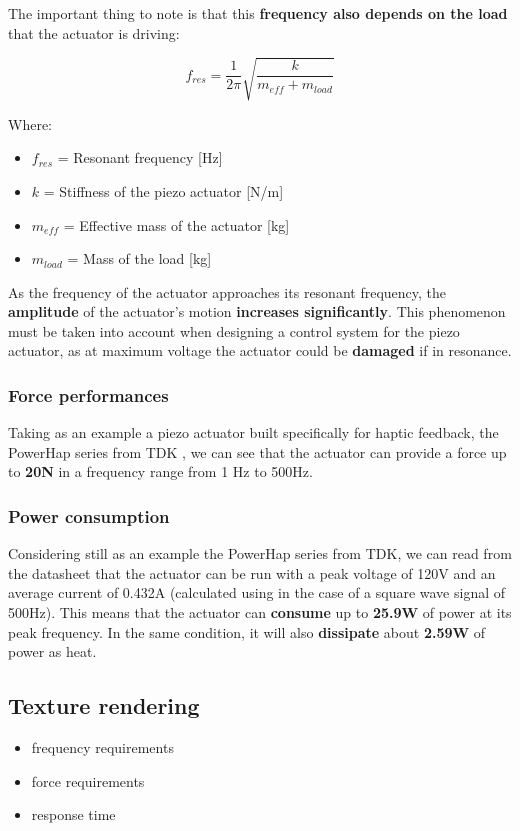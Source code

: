 \begin{samepage}
    The important thing to note is that this \textbf{frequency also depends on the load} that the actuator is driving:
    \nopagebreak

    \begin{equation*}
        f_{res} = \frac{1}{2\pi} \sqrt{\frac{k}{m_{eff}+m_{load}}}
    \end{equation*}
    \nopagebreak

    Where:
    \nopagebreak

    \begin{itemize}
        \item \( f_{res} \) = Resonant frequency [Hz]
        \item \( k \) = Stiffness of the piezo actuator [N/m]
        \item \( m_{eff} \) = Effective mass of the actuator [kg]
        \item \( m_{load} \) = Mass of the load [kg]
    \end{itemize}
\end{samepage}


As the frequency of the actuator approaches its resonant frequency, the \textbf{amplitude} of the actuator's motion \textbf{increases significantly}. This phenomenon must be taken into account when designing a control system for the piezo actuator, as at maximum voltage the actuator could be \textbf{damaged} if in resonance.

\subsubsection{Force performances}
Taking as an example a piezo actuator built specifically for haptic feedback, the PowerHap series from TDK \cite{Piezo_Haptic_Actuator}, we can see that the actuator can provide a force up to \textbf{20N} in a frequency range from 1 Hz to 500Hz.

\subsubsection{Power consumption}
Considering still as an example the PowerHap series from TDK, we can read from the datasheet that the actuator can be run with a peak voltage of 120V and an average current of 0.432A (calculated using \cite{Power_piezo_calculator} in the case of a square wave signal of 500Hz). This means that the actuator can \textbf{consume} up to \textbf{25.9W} of power at its peak frequency.
In the same condition, it will also \textbf{dissipate} about \textbf{2.59W} of power as heat.

\subsection{Texture rendering} %
\begin{itemize}
    \item frequency requirements
    \item force requirements
    \item response time
\end{itemize}

